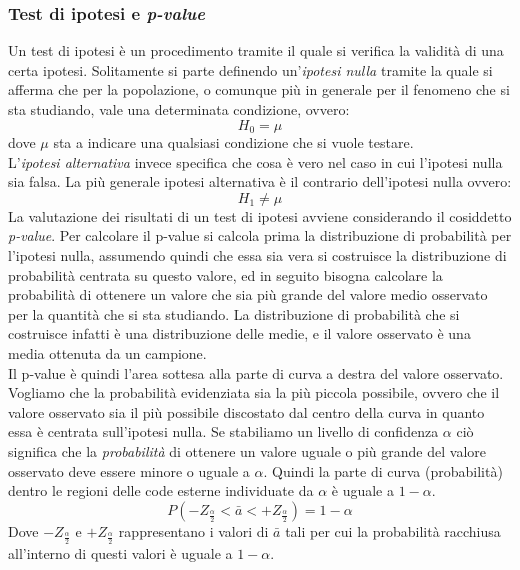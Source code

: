 \documentclass[]{article}
\begin{document}
\subsubsection{Test di ipotesi e \textit{p-value}}
Un test di ipotesi è un procedimento tramite il quale si verifica la validità di una certa ipotesi. Solitamente si parte definendo un'\textit{ipotesi nulla} tramite la quale si afferma che per la popolazione, o comunque più in generale per il fenomeno che si sta studiando, vale una determinata condizione, ovvero:
\begin{equation}
H_0 = \mu 
\end{equation}
dove $\mu$ sta a indicare una qualsiasi condizione che si vuole testare. \\
L'\textit{ipotesi alternativa} invece specifica che cosa è vero nel caso in cui l'ipotesi nulla sia falsa. La più generale ipotesi alternativa è il contrario dell'ipotesi nulla ovvero:
\begin{equation}
H_1 \neq \mu 
\end{equation}
La valutazione dei risultati di un test di ipotesi avviene considerando il cosiddetto \textit{p-value}. Per calcolare il p-value si calcola prima la distribuzione di probabilità per l'ipotesi nulla, assumendo quindi che essa sia vera si costruisce la distribuzione di probabilità centrata su questo valore, ed in seguito bisogna calcolare la probabilità di ottenere un valore che sia più grande del valore medio osservato per la quantità che si sta studiando. La distribuzione di probabilità che si costruisce infatti è una distribuzione delle  medie, e il valore osservato è una media ottenuta da un campione.\\ 
Il p-value è quindi l'area sottesa alla parte di curva a destra del valore osservato.
Vogliamo che la probabilità evidenziata sia la più piccola possibile, ovvero che il valore osservato sia il più possibile discostato dal centro della curva in quanto essa è centrata sull'ipotesi nulla. Se stabiliamo un livello di confidenza $\alpha$ ciò significa che la \textit{probabilità} di ottenere un valore uguale o più grande del valore osservato deve essere minore o uguale a $\alpha$. Quindi la parte di curva (probabilità) dentro le regioni delle code esterne individuate da $\alpha$ è uguale a $1-\alpha$.
\begin{equation}
P(-Z_{\frac{\alpha}{2}}< \bar{a} < +Z_{\frac{\alpha}{2}}) = 1 - \alpha
\end{equation}
Dove $-Z_{\frac{\alpha}{2}}$ e $+Z_{\frac{\alpha}{2}}$ rappresentano i valori di $\bar{a}$ tali per cui la probabilità racchiusa all'interno di questi valori è uguale a $1-\alpha$. 
\end{document}
